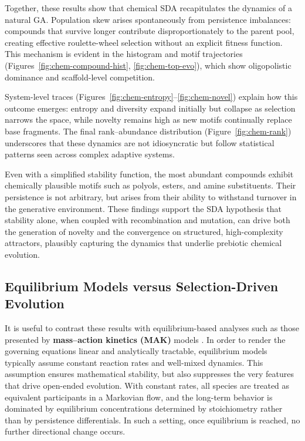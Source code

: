 \documentclass[life,article,submit,pdftex,moreauthors]{Definitions/mdpi}
\begin{document}
Together, these results show that chemical SDA recapitulates the dynamics of a natural GA. Population skew arises spontaneously from persistence imbalances: compounds that survive longer contribute disproportionately to the parent pool, creating effective roulette-wheel selection without an explicit fitness function. This mechanism is evident in the histogram and motif trajectories (Figures~\ref{fig:chem-compound-hist}, \ref{fig:chem-top-evo}), which show oligopolistic dominance and scaffold-level competition.  

System-level traces (Figures~\ref{fig:chem-entropy}--\ref{fig:chem-novel}) explain how this outcome emerges: entropy and diversity expand initially but collapse as selection narrows the space, while novelty remains high as new motifs continually replace base fragments. The final rank–abundance distribution (Figure~\ref{fig:chem-rank}) underscores that these dynamics are not idiosyncratic but follow statistical patterns seen across complex adaptive systems.  

Even with a simplified stability function, the most abundant compounds exhibit chemically plausible motifs such as polyols, esters, and amine substituents. Their persistence is not arbitrary, but arises from their ability to withstand turnover in the generative environment. These findings support the SDA hypothesis that stability alone, when coupled with recombination and mutation, can drive both the generation of novelty and the convergence on structured, high-complexity attractors, plausibly capturing the dynamics that underlie prebiotic chemical evolution.  


\subsection{Equilibrium Models versus Selection-Driven Evolution}

It is useful to contrast these results with equilibrium-based analyses such as those presented by \textbf{mass–action kinetics (MAK)} models
\cite{fogler1999chemical,TuranyiTomlin2014}. In order to render the governing equations linear and analytically tractable, equilibrium models typically assume constant reaction rates and well-mixed dynamics. This assumption ensures mathematical stability, but also suppresses the very features that drive open-ended evolution. With constant rates, all species are treated as equivalent participants in a Markovian flow, and the long-term behavior is dominated by equilibrium concentrations determined by stoichiometry rather than by persistence differentials. In such a setting, once equilibrium is reached, no further directional change occurs.
\end{document}
